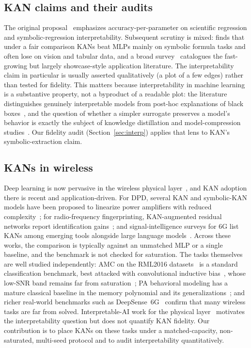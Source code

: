 \documentclass[final,5p,times]{elsarticle}
\begin{document}
\subsection{KAN claims and their audits}
The original proposal~\cite{liu2024kan} emphasizes accuracy-per-parameter on scientific
regression and symbolic-regression interpretability. Subsequent scrutiny is mixed:
\cite{yu2024fairer} finds that under a fair comparison KANs beat MLPs mainly on symbolic
formula tasks and often lose on vision and tabular data, and a broad survey~\cite{kansurvey2024}
catalogues the fast-growing but largely showcase-style application literature. The
interpretability claim in particular is usually asserted qualitatively (a plot of a few
edges) rather than tested for fidelity. This matters because interpretability in machine
learning is a substantive property, not a byproduct of a readable plot: the literature
distinguishes genuinely interpretable models from post-hoc explanations of black
boxes~\cite{rudin2019,molnar2020,lundberg2017shap}, and the question of whether a simpler
surrogate preserves a model's behavior is exactly the subject of knowledge distillation and
model-compression studies~\cite{hinton2015distill,ba2014deep}. Our fidelity audit
(Section~\ref{sec:interp}) applies that lens to KAN's symbolic-extraction claim.

\subsection{KANs in wireless}
Deep learning is now pervasive in the wireless physical layer~\cite{oshea2017intro,lecun2015deep},
and KAN adoption there is recent and application-driven. For DPD, several KAN and symbolic-KAN
models have been proposed to linearize power amplifiers with reduced
complexity~\cite{kandpd,kandpd_rof,etdkan}; for radio-frequency fingerprinting,
KAN-augmented residual networks report identification gains~\cite{kanrff}; and
signal-intelligence surveys for 6G list KANs among emerging tools alongside large language
models~\cite{wsr6g,radiollm}. Across these works, the comparison is typically against an
unmatched MLP or a single baseline, and the benchmark is not checked for saturation. The
tasks themselves are well studied independently: AMC on the RML2016 datasets~\cite{oshea2016conv,oshea2016gnuradio,oshea2018over}
is a standard classification benchmark, best attacked with convolutional inductive
bias~\cite{krizhevsky2012}, whose low-SNR band remains far from saturation~\cite{rml22,fsosamc};
PA behavioral modeling has a mature classical baseline in the memory polynomial and its
generalizations~\cite{ding2004mempoly,morgan2006gmp,saleh1981}; and richer real-world
benchmarks such as DeepSense~6G~\cite{deepsense6g} confirm that many wireless tasks are far
from solved. Interpretable-AI work for the physical layer~\cite{xaichannel} motivates the
interpretability question but does not quantify KAN fidelity. Our contribution is to place
KANs on these tasks under a matched-capacity, non-saturated, multi-seed protocol and to
audit interpretability quantitatively.
\end{document}
